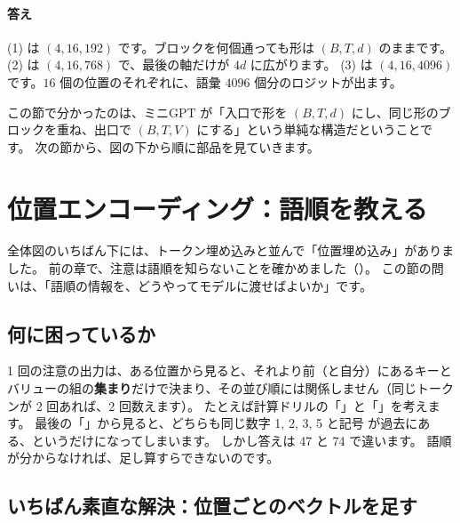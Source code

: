 \paragraph{答え}
(1) は $(4,16,192)$ です。ブロックを何個通っても形は $(B,T,d)$ のままです。
(2) は $(4,16,768)$ で、最後の軸だけが $4d$ に広がります。
(3) は $(4,16,4096)$ です。$16$ 個の位置のそれぞれに、語彙 $4096$ 個分のロジットが出ます。

この節で分かったのは、ミニGPT が「入口で形を $(B,T,d)$ にし、同じ形のブロックを重ね、出口で $(B,T,V)$ にする」という単純な構造だということです。
次の節から、図の下から順に部品を見ていきます。

\section{位置エンコーディング：語順を教える}\label{sec:tf-position}

全体図のいちばん下には、トークン埋め込みと並んで「位置埋め込み」がありました。
前の章で、注意は語順を知らないことを確かめました（）。
この節の問いは、「語順の情報を、どうやってモデルに渡せばよいか」です。

\subsection*{何に困っているか}

1 回の注意の出力は、ある位置から見ると、それより前（と自分）にあるキーとバリューの組の\textbf{集まり}だけで決まり、その並び順には関係しません（同じトークンが 2 回あれば、2 回数えます）。
たとえば計算ドリルの「」と「」を考えます。
最後の「\code{=}」から見ると、どちらも同じ数字 1, 2, 3, 5 と記号 \code{+} が過去にある、というだけになってしまいます。
しかし答えは 47 と 74 で違います。
語順が分からなければ、足し算すらできないのです。

\subsection*{いちばん素直な解決：位置ごとのベクトルを足す}

